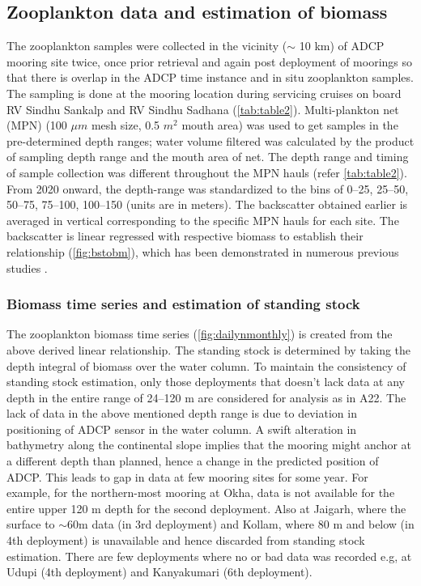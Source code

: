 \documentclass{article}
\begin{document}
	\subsection{Zooplankton data and estimation of biomass}
	The zooplankton  samples were collected in the vicinity ($\sim$ 10 km) of ADCP mooring site twice, once prior retrieval and again post deployment of moorings so that there is overlap in the ADCP time instance and in situ zooplankton samples. The sampling is done at the mooring location during servicing cruises on board RV Sindhu Sankalp and RV Sindhu Sadhana (\autoref{tab:table2}). Multi-plankton net (MPN) (100 $\mu m$ mesh size, 0.5 $m^2$ mouth area) was used to get samples in the pre-determined depth ranges; water volume filtered was calculated by the product of sampling depth range and the mouth area of net. The depth range and timing of sample collection was different throughout the MPN hauls (refer \autoref{tab:table2}). From 2020 onward, the depth-range was standardized to the bins of 0--25, 25--50, 50--75, 75--100, 100--150 (units are in meters). The backscatter obtained earlier is averaged in vertical corresponding to the specific MPN hauls for each site. The backscatter is linear regressed with respective biomass to establish their relationship (\cref{fig:bstobm}), which has been demonstrated in numerous previous studies \citep{flagg1989use,heywood1991estimation,jiang2007temporal,aparna2022seasonal}.
	
	\subsubsection{Biomass time series and estimation of standing stock}
	
	The zooplankton biomass time series (\cref{fig:dailynmonthly}) is created from the above derived linear relationship. The standing stock is determined by taking the depth integral of biomass over the water column. To maintain the consistency of standing stock estimation, only those deployments that doesn't lack data at any depth in the entire range of 24--120 m are considered for analysis as in A22. The lack of data in the above mentioned depth range is due to deviation in positioning of ADCP sensor in the water column. A swift alteration in bathymetry along the continental slope implies that the mooring might anchor at a different depth than planned, hence a change in the predicted position of ADCP. This leads to gap in data at few mooring sites for some year. For example, for the northern-most mooring at Okha, data is not available for the entire upper 120 m depth for the second deployment. Also at Jaigarh, where the surface to $\sim$60m data (in 3rd deployment) and Kollam, where 80 m and below (in 4th deployment) is unavailable and hence discarded from standing stock estimation. There are few deployments where no or bad data was recorded e.g, at Udupi (4th deployment) and Kanyakumari (6th deployment).  	
\end{document}
